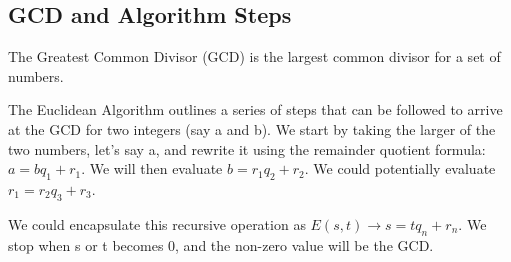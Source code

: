 \documentclass{article}
\begin{document}
\subsection{GCD and Algorithm Steps}
\par\noindent The Greatest Common Divisor (GCD) is the largest common divisor for a set of numbers. 
\newline
\par\noindent The Euclidean Algorithm outlines a series of steps that can be followed to arrive at the GCD for two integers (say a and b). We start by taking the larger of the two numbers, let's say a, and rewrite it using the remainder quotient formula: \(a = bq_{1} + r_{1}\). We will then evaluate \(b = r_{1}q_{2} + r_{2} \). We could potentially evaluate \(r_{1}= r_{2}q_{3} + r_{3} \). 
\newline

\par\noindent We could encapsulate this recursive operation as \(E(s,t) \rightarrow s = tq_{n} + r_{n}\). We stop when s or t becomes 0, and the non-zero value will be the GCD.
\newline
\newline
{}
\newline
\newline
\newline
{}
\end{document}
